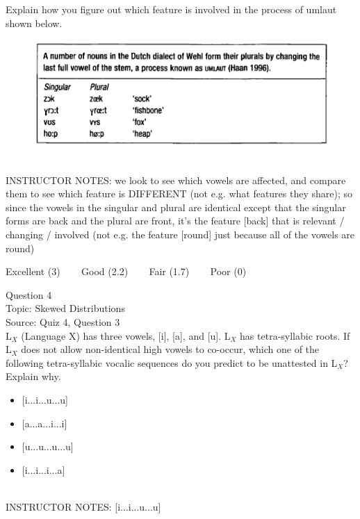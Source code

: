 \documentclass[12pt]{article}
\begin{document}
Explain how you figure out which feature is involved in the process of umlaut shown below.\\

\begin{figure}[H]
\includegraphics{../images/dutch.png}
\end{figure}

~\\
INSTRUCTOR NOTES: we look to see which vowels are affected, and compare them to see which feature is DIFFERENT (not e.g. what features they share); so since the vowels in the singular and plural are identical except that the singular forms are back and the plural are front, it's the feature [back] that is relevant / changing / involved (not e.g. the feature [round] just because all of the vowels are round)


\vfill
Excellent (3) ~~~ Good (2.2) ~~~ Fair (1.7) ~~~ Poor (0)
\newpage

{\large Question 4}\\

Topic: Skewed Distributions\\
Source: Quiz 4, Question 3\\

L$_X$ (Language X) has three vowels, [i], [a], and [u]. L$_X$ has tetra-syllabic roots. If L$_X$ does not allow non-identical high vowels to co-occur, which one of the following tetra-syllabic vocalic sequences do you predict to be unattested in L$_X$? Explain why.\\

\begin{itemize} \item {[i...i...u...u]} \item {[a...a...i...i]} \item {[u...u...u...u]} \item {[i...i...i...a]} \end{itemize}


~\\
INSTRUCTOR NOTES: [i...i...u...u]
\end{document}
